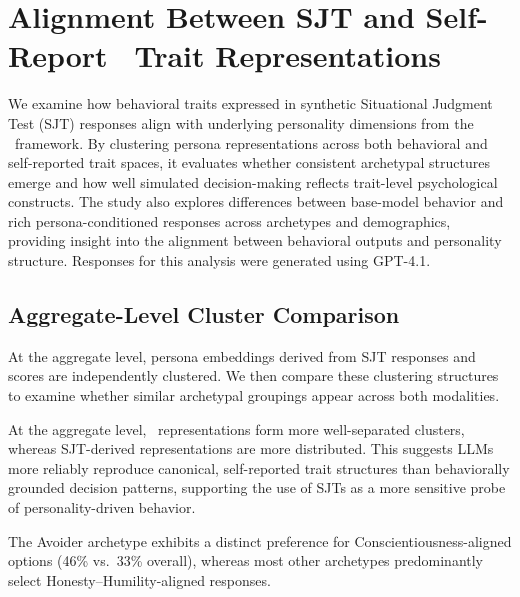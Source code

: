 \section{Alignment Between SJT and Self-Report \hexaco\ Trait Representations}
\label{sec:alignment}
We examine how behavioral traits expressed in synthetic Situational Judgment Test (SJT) responses align with underlying personality dimensions from the \hexaco\ framework. By clustering persona representations across both behavioral and self-reported trait spaces, it evaluates whether consistent archetypal structures emerge and how well simulated decision-making reflects trait-level psychological constructs. The study also explores differences between base-model behavior and rich persona-conditioned responses across archetypes and demographics, providing insight into the alignment between behavioral outputs and personality structure. Responses for this analysis were generated using GPT-4.1.



\subsection{Aggregate-Level Cluster Comparison}

At the aggregate level, persona embeddings derived from SJT responses and \hexaco\;  scores are independently clustered. We then compare these clustering structures to examine whether similar archetypal groupings appear across both modalities.

At the aggregate level, \hexaco\ representations form more well-separated clusters, whereas SJT-derived representations are more distributed. This suggests LLMs more reliably reproduce canonical, self-reported trait structures than behaviorally grounded decision patterns, supporting the use of SJTs as a more sensitive probe of personality-driven behavior.

The Avoider archetype exhibits a distinct preference for \textcolor{hexC}{Conscientiousness}-aligned options (46\% vs.\ 33\% overall), whereas most other archetypes predominantly select \textcolor{hexH}{Honesty--Humility}-aligned responses.


